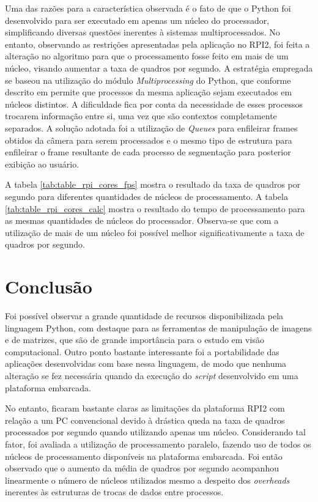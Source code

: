 \documentclass[conference]{IEEEtran}
\begin{document}
Uma das razões para a característica observada é o fato de que o Python foi desenvolvido para ser executado em apenas um núcleo do processador, simplificando diversas questões inerentes à sistemas multiprocessados. No entanto, observando as restrições apresentadas pela aplicação no RPI2, foi feita a alteração no algoritmo para que o processamento fosse feito em mais de um núcleo, visando aumentar a taxa de quadros por segundo. A estratégia empregada se baseou na utilização do módulo \textit{Multiprocessing} do Python, que conforme descrito em \cite{IEEEhowto:micha} permite que processos da mesma aplicação sejam executados em núcleos distintos. A dificuldade fica por conta da necessidade de esses processos trocarem informação entre si, uma vez que são contextos completamente separados. A solução adotada foi a utilização de \textit{Queues} para enfileirar frames obtidos da câmera para serem processados e o mesmo tipo de estrutura para enfileirar o frame resultante de cada processo de segmentação para posterior exibição ao usuário. 

A tabela \ref{tab:table_rpi_cores_fps} mostra o resultado da taxa de quadros por segundo para diferentes quantidades de núcleos de processamento. A tabela \ref{tab:table_rpi_cores_calc} mostra o resultado do tempo de processamento para as mesmas quantidades de núcleos do processador. Observa-se que com a utilização de mais de um núcleo foi possível melhor significativamente a taxa de quadros por segundo.


\section{Conclusão}
Foi possível observar a grande quantidade de recursos disponibilizada pela linguagem Python, com destaque para as ferramentas de manipulação de imagens e de matrizes, que são de grande importância para o estudo em visão computacional. Outro ponto bastante interessante foi a portabilidade das aplicações desenvolvidas com base nessa linguagem, de modo que nenhuma alteração se fez necessária quando da execução do \textit{script} desenvolvido em uma plataforma embarcada.

No entanto, ficaram bastante claras as limitações da plataforma RPI2 com relação a um PC convencional devido à drástica queda na taxa de quadros processados por segundo quando utilizando apenas um núcleo. Considerando tal fator, foi avaliada a utilização de processamento paralelo, fazendo uso de todos os núcleos de processamento disponíveis na plataforma embarcada. Foi então observado que o aumento da média de quadros por segundo acompanhou linearmente o número de núcleos utilizados mesmo a despeito dos \textit{overheads} inerentes às estruturas de trocas de dados entre processos.
\end{document}
